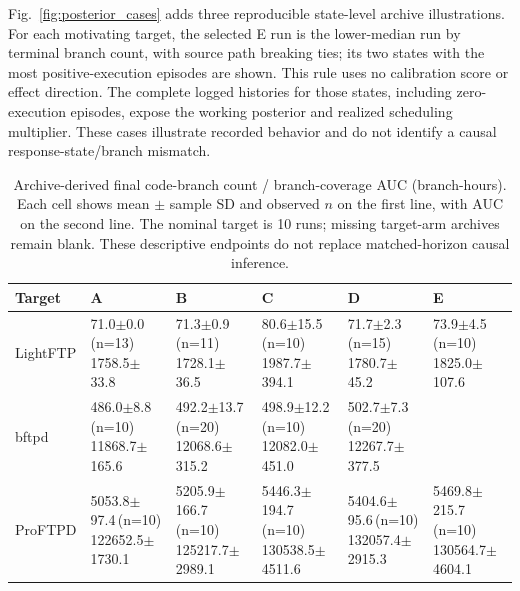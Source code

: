 \documentclass[final,5p,times,number]{elsarticle}
\newcommand{\missing}{\mbox{}}
\newcommand{\figref}[1]{Fig.~\ref{#1}}
\begin{document}
\figref{fig:posterior_cases} adds three reproducible state-level archive illustrations. For each motivating target, the selected E run is the lower-median run by terminal branch count, with source path breaking ties; its two states with the most positive-execution episodes are shown. This rule uses no calibration score or effect direction. The complete logged histories for those states, including zero-execution episodes, expose the working posterior and realized scheduling multiplier. These cases illustrate recorded behavior and do not identify a causal response-state/branch mismatch.



\begin{table}[!tbp]
\centering\small
\caption{Archive-derived final code-branch count / branch-coverage AUC (branch-hours). Each cell shows mean $\pm$ sample SD and observed $n$ on the first line, with AUC on the second line. The nominal target is 10 runs; missing target-arm archives remain blank. These descriptive endpoints do not replace matched-horizon causal inference.}
\label{tab:mainresults}
\begin{tabularx}{\textwidth}{l *{5}{>{\centering\arraybackslash}X}}
\toprule
Target & A & B & C & D & E \\
\midrule
LightFTP & \shortstack{71.0$\pm$0.0\,(n=13)\\1758.5$\pm$33.8} & \shortstack{71.3$\pm$0.9\,(n=11)\\1728.1$\pm$36.5} & \shortstack{80.6$\pm$15.5\,(n=10)\\1987.7$\pm$394.1} & \shortstack{71.7$\pm$2.3\,(n=15)\\1780.7$\pm$45.2} & \shortstack{73.9$\pm$4.5\,(n=10)\\1825.0$\pm$107.6} \\
\addlinespace[3pt]
bftpd & \shortstack{486.0$\pm$8.8\,(n=10)\\11868.7$\pm$165.6} & \shortstack{492.2$\pm$13.7\,(n=20)\\12068.6$\pm$315.2} & \shortstack{498.9$\pm$12.2\,(n=10)\\12082.0$\pm$451.0} & \shortstack{502.7$\pm$7.3\,(n=20)\\12267.7$\pm$377.5} & \missing \\
\addlinespace[3pt]
ProFTPD & \shortstack{5053.8$\pm$97.4\,(n=10)\\122652.5$\pm$1730.1} & \shortstack{5205.9$\pm$166.7\,(n=10)\\125217.7$\pm$2989.1} & \shortstack{5446.3$\pm$194.7\,(n=10)\\130538.5$\pm$4511.6} & \shortstack{5404.6$\pm$95.6\,(n=10)\\132057.4$\pm$2915.3} & \shortstack{5469.8$\pm$215.7\,(n=10)\\130564.7$\pm$4604.1} \\

\end{tabularx}
\end{table}
\end{document}
